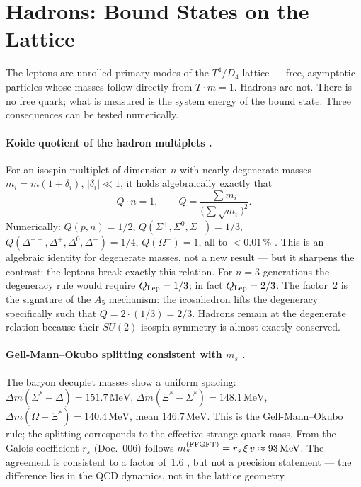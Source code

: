 \section{Hadrons: Bound States on the Lattice}
\label{sec:hadronen}

The leptons are unrolled primary modes of the $T^4/D_4$ lattice --- free,
asymptotic particles whose masses follow directly from
$\tilde T\cdot m = 1$. Hadrons are not. There is no free quark; what is
measured is the system energy of the bound state. Three consequences can be
tested numerically.

\paragraph{Koide quotient of the hadron multiplets \BM.}
For an isospin multiplet of dimension $n$ with nearly degenerate masses
$m_i = m(1+\delta_i)$, $|\delta_i|\ll1$, it holds algebraically exactly that
\[
  Q \cdot n = 1, \qquad Q = \frac{\sum m_i}{\bigl(\sum\sqrt{m_i}\bigr)^2}.
\]
Numerically: $Q(p,n) = 1/2$, $Q(\Sigma^+,\Sigma^0,\Sigma^-) = 1/3$,
$Q(\Delta^{++},\Delta^+,\Delta^0,\Delta^-) = 1/4$, $Q(\Omega^-) = 1$, all to
$< 0.01\,\%$ \BM. This is an algebraic identity for degenerate masses, not a
new result --- but it sharpens the contrast: the leptons break exactly this
relation. For $n = 3$ generations the degeneracy rule would require
$Q_{\rm Lep} = 1/3$; in fact $Q_{\rm Lep} = 2/3$. The factor~2 is the
signature of the $A_5$ mechanism: the icosahedron lifts the degeneracy
specifically such that $Q = 2\cdot(1/3) = 2/3$. Hadrons remain at the
degenerate relation because their $SU(2)$ isospin symmetry is almost exactly
conserved.

\paragraph{Gell-Mann--Okubo splitting consistent with $m_s$ \KM.}
The baryon decuplet masses show a uniform spacing:
$\Delta m(\Sigma^*{-}\Delta) = 151.7\,\text{MeV}$,
$\Delta m(\Xi^*{-}\Sigma^*) = 148.1\,\text{MeV}$,
$\Delta m(\Omega{-}\Xi^*) = 140.4\,\text{MeV}$, mean $146.7\,\text{MeV}$.
This is the Gell-Mann--Okubo rule; the splitting corresponds to the effective
strange quark mass. From the Galois coefficient $r_s$ (Doc.~006) follows
$m_s^{(\rm FFGFT)} = r_s\,\xi\,v \approx 93\,\text{MeV}$. The agreement is
consistent to a factor of~1.6 \KM, but not a precision statement --- the
difference lies in the QCD dynamics, not in the lattice geometry.

